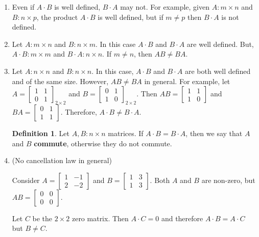 \documentclass[12pt]{article}
\theoremstyle{definition}
\newtheorem*{definition}{Definition}
\begin{document}
\begin{enumerate}
\item Even if $A \cdot B$ is well defined, $B \cdot A$ may not. For example, given $A: m \times n$ and $B: n \times p$,
the product $A \cdot B$ is well defined, but if $m \neq p$ then $B \cdot A$ is not defined.

\item Let $A: m \times n$ and $B: n \times m$. In this case $A \cdot B$ and $B \cdot A$ are well defined. But,
$A \cdot B: m \times m$ and $B \cdot A: n \times n$. If $m \neq n$, then $AB \neq BA$.

\item Let $A: n \times n$ and $B: n \times n$. In this case, $A \cdot B$ and $B \cdot A$ are both well defined and
of the same size. However, $AB \neq BA$ in general. For example, let 
$A = \begin{bmatrix} 1 & 1 \\ 0 & 1 \end{bmatrix}_{2 \times 2}$ and
$B = \begin{bmatrix} 0 & 1 \\ 1 & 0 \end{bmatrix}_{2 \times 2}$. Then
$AB = \begin{bmatrix} 1 & 1 \\ 1 & 0 \end{bmatrix}$ and
$BA = \begin{bmatrix} 0 & 1 \\ 1 & 1 \end{bmatrix}$. Therefore, $A \cdot B \neq B \cdot A$. 


\begin{definition}
Let $A, B: n \times n$ matrices. If $A \cdot B = B \cdot A$, then we say that $A$ and $B$ \textbf{commute}, otherwise
they do not commute.
\end{definition}


\item (No cancellation law in general)

Consider $A = \begin{bmatrix} 1 & -1 \\ 2 & -2 \end{bmatrix}$ and $B = \begin{bmatrix} 1 & 3 \\ 1 & 3 \end{bmatrix}$.
Both $A$ and $B$ are non-zero, but $AB = \begin{bmatrix} 0 & 0 \\ 0 & 0 \end{bmatrix}$.

Let $C$ be the $2 \times 2$ zero matrix. Then $A \cdot C = 0$ and therefore $A \cdot B = A \cdot C$ but $B \neq C$.

\end{enumerate}
\end{document}

